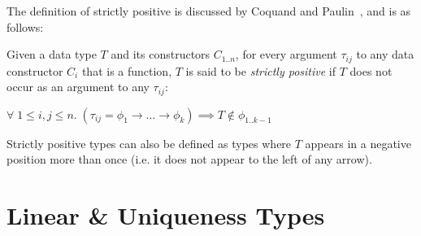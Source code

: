 The definition of strictly positive is discussed by Coquand and Paulin~\cite{CoquandTypes}, and is as follows:

\theoremstyle{definition}
\begin{definition}
    Given a data type $T$ and its constructors $C_{1..n}$, for every argument $\tau_{ij}$
    to any data constructor $C_i$ that is a function, $T$ is said to be \textit{strictly positive} if 
    $T$ does not occur as an argument to any $\tau_{ij}$:

    \label{def:sp}
    \begin{center}
        $\forall\; 1 \leq i,j \leq n.\;
        (\tau_{ij} = \phi_{1} \rightarrow \dots \rightarrow \phi_{k})
        \implies T \notin \phi_{1..k-1}$
    \end{center}
\end{definition}

Strictly positive types can also be defined as types where $T$ appears in a negative position more than once 
(i.e. it does not appear to the left of any arrow).

\section{Linear \& Uniqueness Types}
